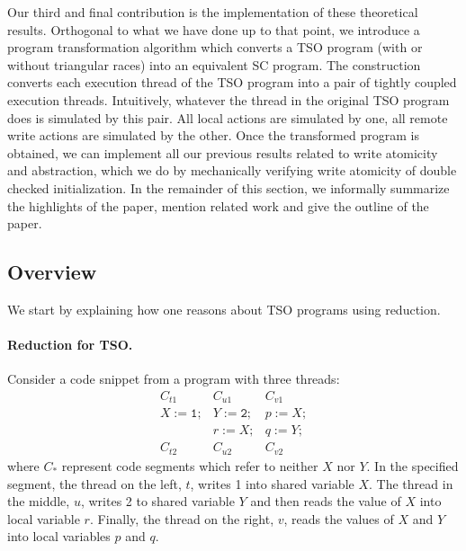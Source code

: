 \documentclass[preprint,9pt]{sigplanconf}
\begin{document}
Our third and final contribution is the implementation of these theoretical results.
Orthogonal to what we have done up to that point, we introduce a program transformation algorithm which converts a TSO program (with or without triangular races) into an equivalent SC program.
The construction converts each execution thread of the TSO program into a pair of tightly coupled execution threads.
Intuitively, whatever the thread in the original TSO program does is simulated by this pair. 
All local actions are simulated by one, all remote write actions are simulated by the other.
Once the transformed program is obtained, we can implement all our previous results related to write atomicity and abstraction, which we do by mechanically verifying write atomicity of double checked initialization.
In the remainder of this section, we informally summarize the highlights of the paper, mention related work and give the outline of the paper.
 
\subsection{Overview}
\label{subsec:overview}
We start by explaining how one reasons about TSO programs using reduction.

\paragraph{Reduction for TSO.}
Consider a code snippet from a program with three threads:
{\small
\begin{eqnarray*} 
 C_{t1} &  C_{u1} &  C_{v1}\\
X \mathtt{:= 1;} &  Y\mathtt{:= 2;} &  p\mathtt{:=}X\mathtt{;}\\
& r\mathtt{:= }X\mathtt{;} &  q\mathtt{:=}Y\mathtt{;}\\
C_{t2} & C_{u2} & C_{v2}
\end{eqnarray*}
}
where $C_*$ represent code segments which refer to neither $X$ nor $Y$.
In the specified segment, the thread on the left, $t$, writes 1 into shared variable $X$.
The thread in the middle, $u$, writes 2 to shared variable $Y$ and then reads the value of $X$ into local variable $r$.
Finally, the thread on the right, $v$, reads the values of $X$ and $Y$ into local variables $p$ and $q$.
\end{document}
